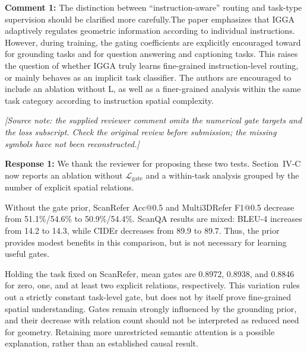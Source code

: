 

{\noindent\color{comment}
\textbf{Comment 1:}
The distinction between ``instruction-aware'' routing and task-type supervision should be clarified more carefully.The paper emphasizes that IGGA adaptively regulates geometric information according to individual instructions. However, during training, the gating coefficients are explicitly encouraged toward  for grounding tasks and for question answering and captioning tasks. This raises the question of whether IGGA truly learns fine-grained instruction-level routing, or mainly behaves as an implicit task classifier.  The authors are encouraged to include an ablation without L, as well as a finer-grained analysis within the same task category according to instruction spatial complexity.
}\vspace{\comafter}

\noindent\textit{[Source note: the supplied reviewer comment omits the numerical gate targets and the loss subscript. Check the original review before submission; the missing symbols have not been reconstructed.]}

\noindent\textbf{Response 1:}
We thank the reviewer for proposing these two tests. Section~IV-C now reports an ablation without $\mathcal{L}_{\mathrm{gate}}$ and a within-task analysis grouped by the number of explicit spatial relations.

Without the gate prior, ScanRefer Acc@0.5 and Multi3DRefer F1@0.5 decrease from 51.1\%/54.6\% to 50.9\%/54.4\%. ScanQA results are mixed: BLEU-4 increases from 14.2 to 14.3, while CIDEr decreases from 89.9 to 89.7. Thus, the prior provides modest benefits in this comparison, but is not necessary for learning useful gates.

Holding the task fixed on ScanRefer, mean gates are 0.8972, 0.8938, and 0.8846 for zero, one, and at least two explicit relations, respectively. This variation rules out a strictly constant task-level gate, but does not by itself prove fine-grained spatial understanding. Gates remain strongly influenced by the grounding prior, and their decrease with relation count should not be interpreted as reduced need for geometry. Retaining more unrestricted semantic attention is a possible explanation, rather than an established causal result.
\vspace{\resafter}


